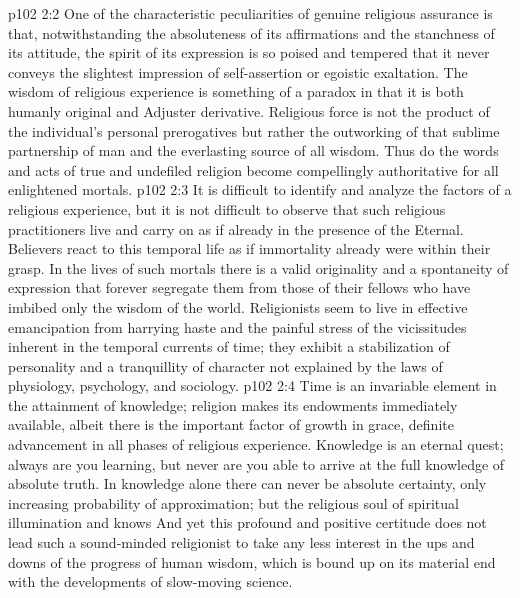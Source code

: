 \vs p102 2:2 One of the characteristic peculiarities of genuine religious assurance is that, notwithstanding the absoluteness of its affirmations and the stanchness of its attitude, the spirit of its expression is so poised and tempered that it never conveys the slightest impression of self\hyp{}assertion or egoistic exaltation. The wisdom of religious experience is something of a paradox in that it is both humanly original and Adjuster derivative. Religious force is not the product of the individual’s personal prerogatives but rather the outworking of that sublime partnership of man and the everlasting source of all wisdom. Thus do the words and acts of true and undefiled religion become compellingly authoritative for all enlightened mortals.
\vs p102 2:3 It is difficult to identify and analyze the factors of a religious experience, but it is not difficult to observe that such religious practitioners live and carry on as if already in the presence of the Eternal. Believers react to this temporal life as if immortality already were within their grasp. In the lives of such mortals there is a valid originality and a spontaneity of expression that forever segregate them from those of their fellows who have imbibed only the wisdom of the world. Religionists seem to live in effective emancipation from harrying haste and the painful stress of the vicissitudes inherent in the temporal currents of time; they exhibit a stabilization of personality and a tranquillity of character not explained by the laws of physiology, psychology, and sociology.
\pc \vs p102 2:4 Time is an invariable element in the attainment of knowledge; religion makes its endowments immediately available, albeit there is the important factor of growth in grace, definite advancement in all phases of religious experience. Knowledge is an eternal quest; always are you learning, but never are you able to arrive at the full knowledge of absolute truth. In knowledge alone there can never be absolute certainty, only increasing probability of approximation; but the religious soul of spiritual illumination  and knows  And yet this profound and positive certitude does not lead such a sound\hyp{}minded religionist to take any less interest in the ups and downs of the progress of human wisdom, which is bound up on its material end with the developments of slow\hyp{}moving science.
